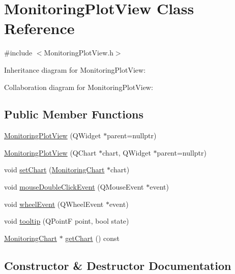 \hypertarget{class_monitoring_plot_view}{}\section{Monitoring\+Plot\+View Class Reference}
\label{class_monitoring_plot_view}


{\ttfamily \#include $<$Monitoring\+Plot\+View.\+h$>$}



Inheritance diagram for Monitoring\+Plot\+View\+:


Collaboration diagram for Monitoring\+Plot\+View\+:
\subsection*{Public Member Functions}
\begin{DoxyCompactItemize}
\item 
\hyperlink{class_monitoring_plot_view_acae83878ab51aba65fe68a1221461be6}{Monitoring\+Plot\+View} (Q\+Widget $\ast$parent=nullptr)
\item 
\hyperlink{class_monitoring_plot_view_ac3cc04c3803296691b6b518031ea9686}{Monitoring\+Plot\+View} (Q\+Chart $\ast$chart, Q\+Widget $\ast$parent=nullptr)
\item 
void \hyperlink{class_monitoring_plot_view_ad81016fcd65a1958ce9f29b62ba643ba}{set\+Chart} (\hyperlink{class_monitoring_chart}{Monitoring\+Chart} $\ast$chart)
\item 
void \hyperlink{class_monitoring_plot_view_af2daa76272f096fe4964ca749eca12ca}{mouse\+Double\+Click\+Event} (Q\+Mouse\+Event $\ast$event)
\item 
void \hyperlink{class_monitoring_plot_view_a72ad09274ce92ddf7893b526d31f7589}{wheel\+Event} (Q\+Wheel\+Event $\ast$event)
\item 
void \hyperlink{class_monitoring_plot_view_a4dada86aa665a7a835984d57600768db}{tooltip} (Q\+PointF point, bool state)
\item 
\hyperlink{class_monitoring_chart}{Monitoring\+Chart} $\ast$ \hyperlink{class_monitoring_plot_view_a9fe79ccff8228c3ecd6f6ca9d2c59005}{get\+Chart} () const
\end{DoxyCompactItemize}


\subsection{Constructor \& Destructor Documentation}
\mbox{\label{class_monitoring_plot_view_acae83878ab51aba65fe68a1221461be6}} 
